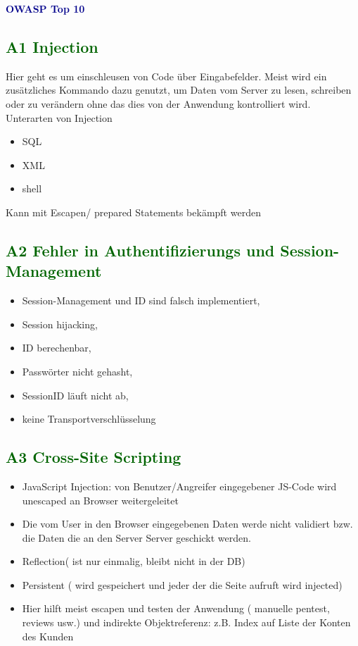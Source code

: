 \textbf{\textcolor{darkblue}{ OWASP Top 10}}~

\subsection*{\textcolor{darkgreen}{A1 Injection}}

Hier geht es um einschleusen von Code über Eingabefelder. Meist wird ein zusätzliches Kommando
dazu genutzt, um Daten vom Server zu lesen, schreiben oder zu verändern ohne das dies von
der Anwendung kontrolliert wird.
Unterarten von Injection
	\begin{itemize}
	\item SQL
	\item XML
	\item shell
	\end{itemize}
Kann mit Escapen/ prepared Statements bekämpft werden
\subsection*{\textcolor{darkgreen}{A2 Fehler in Authentifizierungs und Session-Management}}

	\begin{itemize}
	\item Session-Management und ID sind falsch implementiert,
	\item Session hijacking,
	\item ID berechenbar,
	\item Passwörter nicht gehasht,
	\item SessionID läuft nicht ab,
	\item keine Transportverschlüsselung
	\end{itemize}

\subsection*{\textcolor{darkgreen}{A3 Cross-Site Scripting}}

	\begin{itemize}
	\item JavaScript Injection: von Benutzer/Angreifer eingegebener JS-Code wird unescaped an Browser weitergeleitet
	\item Die vom User in den Browser eingegebenen Daten werde nicht validiert bzw. die Daten die an den Server
	Server geschickt werden. 
	\item Reflection( ist nur einmalig, bleibt nicht in der DB) 
	\item Persistent ( wird gespeichert und jeder der die Seite aufruft wird injected)
\item Hier hilft meist escapen und testen der Anwendung ( manuelle pentest, reviews usw.) und indirekte Objektreferenz: z.B. Index auf Liste der Konten des Kunden
	\end{itemize}
